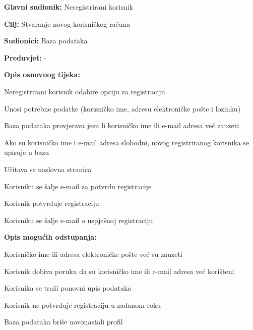 					\noindent {}
					\begin{packed_item}
						
						\item \textbf{Glavni sudionik: }Neregistrirani korisnik
						\item \textbf{Cilj: }Stvaranje novog korisničkog računa
						\item \textbf{Sudionici: }Baza podataka
						\item \textbf{Preduvjet: }-
						\item \textbf{Opis osnovnog tijeka:}
						\item[] \begin{packed_enum}
							\item Neregistrirani korisnik odabire opciju za registraciju
							\item Unosi potrebne podatke (korisničko ime, adresu elektroničke pošte i lozinku)
							\item Baza podataka provjerava jesu li korisničko ime ili e-mail adresa već zauzeti
							\item Ako su korisničko ime i e-mail adresa slobodni, novog registriranog korisnika se upisuje u bazu
							\item Učitava se naslovna stranica
							\item Korisniku se šalje e-mail za potvrdu registracije
							\item Korisnik potvrđuje registraciju
							\item Korisniku se šalje e-mail o uspješnoj registraciju
						\end{packed_enum}
						\item \textbf{Opis mogućih odstupanja:}
						\item[] \begin{packed_enum}
							\item[3.a] Korisničko ime ili adresa elektroničke pošte već su zauzeti
							\begin{packed_enum}
								\item[1.] Korisnik dobiva poruku da su korisničko ime ili e-mail adresa već korišteni
								\item[2.] Korisnika se traži ponovni upis podataka
							\end{packed_enum}
							\item[7.a] Korisnik ne potvrđuje registraciju u zadanom roku
							\begin{packed_enum}
								\item[1.] Baza podataka briše novonastali profil
							\end{packed_enum}
						\end{packed_enum}
					\end{packed_item}
					
